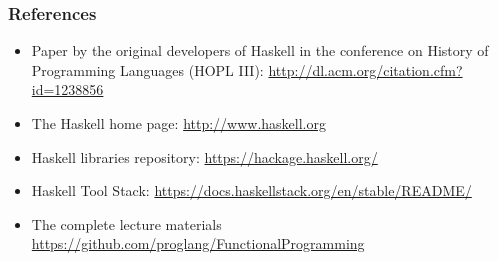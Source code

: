 \documentclass{beamer}
\begin{document}
\begin{frame}
  \frametitle{References}
  \begin{itemize}
  \item Paper by the original developers of Haskell in the conference on History of
    Programming Languages (HOPL III): \href{A History
      of Haskell: Being Lazy with
      Class}{http://dl.acm.org/citation.cfm?id=1238856}
  \item The Haskell home page: \url{http://www.haskell.org}
  \item Haskell libraries repository:
    \url{https://hackage.haskell.org/}
  \item Haskell Tool Stack:
    \url{https://docs.haskellstack.org/en/stable/README/}
  \item The complete lecture materials
    \url{https://github.com/proglang/FunctionalProgramming}
  \end{itemize}
\end{frame}


\end{document}
